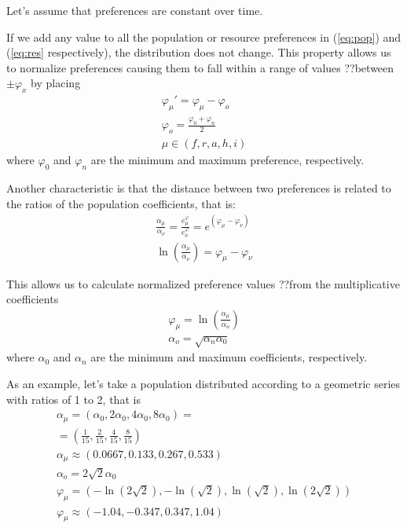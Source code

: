 \documentclass[a4paper,twoside]{article}
\begin{document}
Let's assume that preferences are constant over time.

If we add any value to all the population or resource preferences in (\ref{eq:pop}) and (\ref{eq:res} respectively), the distribution does not change.
This property allows us to normalize preferences
causing them to fall within a range of values ??between $ \pm \varphi_x$ by placing
\begin{eqnarray*}
	\varphi_\mu' = \varphi_\mu - \varphi_o
	\\
	\varphi_o = \frac{\varphi_0 + \varphi_n}{2}
	\\
	\mu \in (f, r, a, h, i)
\end{eqnarray*}
where $ \varphi_0 $ and $ \varphi_n $ are the minimum and maximum preference, respectively.

Another characteristic is that the distance between two preferences is related to the ratios of the population coefficients, that is:
\begin{eqnarray*}
	\frac{\alpha_\mu}{\alpha_\nu} = \frac{e^\varphi_\mu}{e^\varphi_\nu} = e^{(\varphi_\mu-\varphi_\nu)}
	\\
	\ln \left( \frac{\alpha_\mu}{\alpha_\nu} \right) = \varphi_\mu-\varphi_\nu
\end{eqnarray*}

This allows us to calculate normalized preference values ??from the multiplicative coefficients
\begin{eqnarray*}
	\varphi_\mu = \ln \left( \frac{\alpha_\mu}{\alpha_o} \right)
	\\
	\alpha_o = \sqrt{\alpha_n \alpha_0}
\end{eqnarray*}
where $ \alpha_0 $ and $ \alpha_n $ are the minimum and maximum coefficients, respectively.

As an example, let's take a population distributed according to a geometric series with ratios of 1 to 2, that is
\begin{align*}
	\alpha_\mu = (\alpha_0, 2 \alpha_0, 4 \alpha_0, 8 \alpha_0) =
	\\
	= \left( \frac{1}{15}, \frac{2}{15}, \frac{4}{15}, \frac{8}{15} \right)
	\\
	\alpha_\mu \approx (0.0667, 0.133, 0.267, 0.533)
	\\
	\alpha_o = 2\sqrt{2}\alpha_0	
	\\
	\varphi_\mu = (-\ln(2\sqrt{2}),-\ln(\sqrt{2}), \ln(\sqrt{2}), \ln(2\sqrt{2}))
	\\
	\varphi_\mu	\approx (-1.04, -0.347, 0.347, 1.04)
\end{align*}
\end{document}
